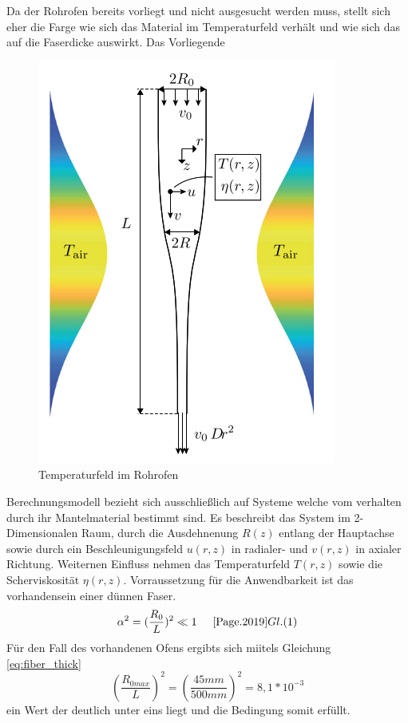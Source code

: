 
Da  der Rohrofen bereits vorliegt und nicht ausgesucht werden muss, stellt sich eher die Farge wie sich das Material im Temperaturfeld verhält und wie sich das auf die Faserdicke auswirkt. Das Vorliegende

\begin{figure}
\includegraphics[width=0.9\linewidth]{Abbildungen/temp_field_clear.png} 
\caption{Temperaturfeld im Rohrofen
\cite{Page.2019} \vspace{1mm}}
\label{fig:thermal_field}
\end{figure}
 Berechnungsmodell bezieht sich ausschließlich auf Systeme welche vom verhalten durch ihr Mantelmaterial bestimmt sind. Es beschreibt das System im 2-Dimensionalen Raum, durch die Ausdehnenung $R(z)$ entlang der Hauptachse sowie durch ein Beschleunigungsfeld $u(r,z)$ in radialer- und $v(r,z)$ in axialer Richtung. Weiternen Einfluss nehmen das Temperaturfeld $T(r,z)$ sowie die Scherviskosität $\eta(r,z)$\cite{Page.2019}. Vorraussetzung für die Anwendbarkeit ist das vorhandensein einer dünnen Faser.
 \begin{equation}
     \alpha^2 = (\frac{R_0}{L})^2 \ll 1 \hspace{5mm}\cite{Page.2019} Gl.(1)
     \label{eq:fiber_thick}
 \end{equation}
Für den Fall des vorhandenen Ofens ergibts sich miitels Gleichung \ref{eq:fiber_thick} 
\begin{equation*}
    (\frac{R_{0max}}{L})^2 = (\frac{45mm}{500mm})^2 =8,1*10^{-3}
\end{equation*}
ein Wert der deutlich unter eins liegt und die Bedingung somit erfüllt.


